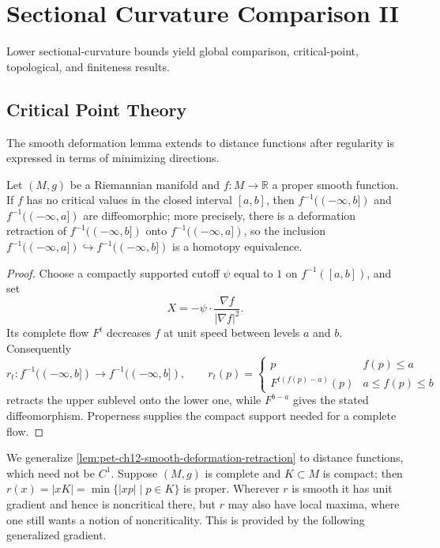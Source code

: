 \chapter{Sectional Curvature Comparison II}
\label{chap:pet-sectional-curvature-comparison-ii}

Lower sectional-curvature bounds yield global comparison, critical-point,
topological, and finiteness results.

\section{Critical Point Theory}

The smooth deformation lemma extends to distance functions after regularity is
expressed in terms of minimizing directions.

\begin{lemma}
  \label{lem:pet-ch12-smooth-deformation-retraction}

  Let $(M,g)$ be a Riemannian manifold and $f:M\to\mathbb{R}$ a proper smooth
  function. If $f$ has no critical values in the closed interval $[a,b]$, then
  $f^{-1}((-\infty,b])$ and $f^{-1}((-\infty,a])$ are diffeomorphic; more
  precisely, there is a deformation retraction of $f^{-1}((-\infty,b])$ onto
  $f^{-1}((-\infty,a])$, so the inclusion
  $f^{-1}((-\infty,a])\hookrightarrow f^{-1}((-\infty,b])$ is a homotopy
  equivalence.
\end{lemma}
\begin{proof}
  \sketch
  Choose a compactly supported cutoff $\psi$ equal to $1$ on
  $f^{-1}([a,b])$, and set
  \[
    X=-\psi\cdot\frac{\nabla f}{|\nabla f|^2}.
  \]
  Its complete flow $F^t$ decreases $f$ at unit speed between levels $a$ and
  $b$. Consequently
  \[
    r_t:f^{-1}((-\infty,b])\to f^{-1}((-\infty,b]),\qquad
    r_t(p)=\begin{cases}p&f(p)\le a\\F^{t(f(p)-a)}(p)&a\le f(p)\le b\end{cases}
  \]
  retracts the upper sublevel onto the lower one, while $F^{b-a}$ gives the
  stated diffeomorphism. Properness supplies the compact support needed for a
  complete flow.
\end{proof}

We generalize \cref{lem:pet-ch12-smooth-deformation-retraction} to distance
functions, which need not be $C^1$. Suppose $(M,g)$ is complete and
$K\subset M$ is compact; then $r(x)=|xK|=\min\{|xp|\mid p\in K\}$ is proper.
Wherever $r$ is smooth it has unit gradient and hence is noncritical there,
but $r$ may also have local maxima, where one still wants a notion of
noncriticality. This is provided by the following generalized gradient.

